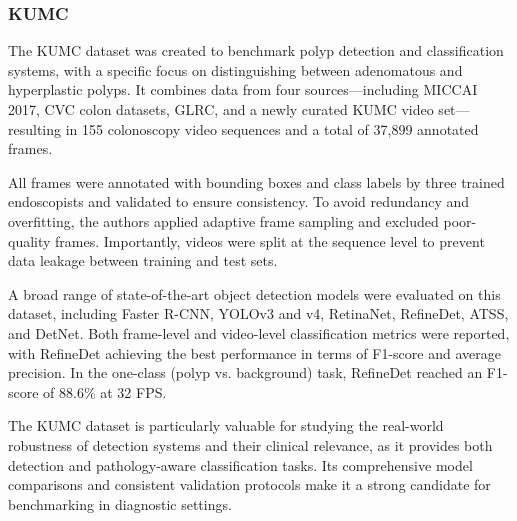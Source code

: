 \subsubsection*{KUMC}

The KUMC dataset was created to benchmark polyp detection and classification systems, with a specific focus on distinguishing between adenomatous and hyperplastic polyps. It combines data from four sources—including MICCAI 2017, CVC colon datasets, GLRC, and a newly curated KUMC video set—resulting in 155 colonoscopy video sequences and a total of 37{,}899 annotated frames.

All frames were annotated with bounding boxes and class labels by three trained endoscopists and validated to ensure consistency. To avoid redundancy and overfitting, the authors applied adaptive frame sampling and excluded poor-quality frames. Importantly, videos were split at the sequence level to prevent data leakage between training and test sets.

A broad range of state-of-the-art object detection models were evaluated on this dataset, including Faster R-CNN, YOLOv3 and v4, RetinaNet, RefineDet, ATSS, and DetNet. Both frame-level and video-level classification metrics were reported, with RefineDet achieving the best performance in terms of F1-score and average precision. In the one-class (polyp vs. background) task, RefineDet reached an F1-score of 88.6\% at 32 FPS.

The KUMC dataset is particularly valuable for studying the real-world robustness of detection systems and their clinical relevance, as it provides both detection and pathology-aware classification tasks. Its comprehensive model comparisons and consistent validation protocols make it a strong candidate for benchmarking in diagnostic settings.

